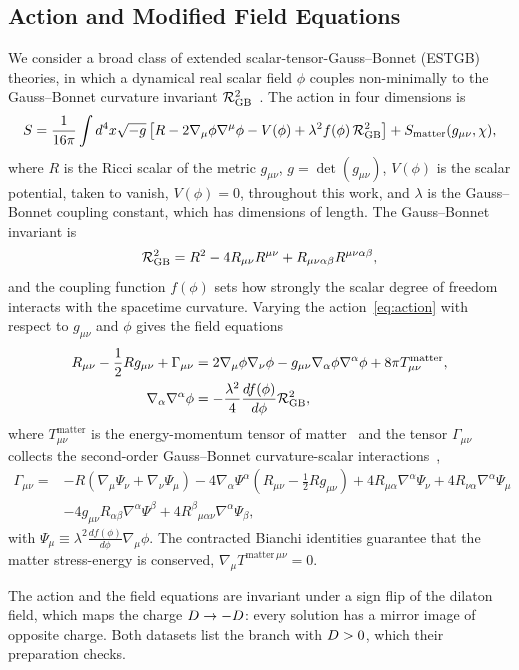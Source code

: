 \subsection{Action and Modified Field Equations}
\label{sec:action}

We consider a broad class of extended scalar-tensor-Gauss--Bonnet (ESTGB) theories, in which a dynamical real scalar field $\phi$ couples non-minimally to the Gauss--Bonnet curvature invariant $\mathcal{R}^2_{\mathrm{GB}}$~\citep{Doneva2017_BH,Doneva2017_NS}. The action in four dimensions is~\citep{Doneva2017_BH}
\begin{equation}
  S = \frac{1}{16\pi} \int d^4x \sqrt{-g} \left[ R - 2\nabla_\mu \phi \nabla^\mu \phi - V(\phi) + \lambda^2 f(\phi)\, \mathcal{R}^2_{\mathrm{GB}} \right] + S_{\mathrm{matter}}(g_{\mu\nu}, \chi),
  \label{eq:action}
\end{equation}
where $R$ is the Ricci scalar of the metric $g_{\mu\nu}$, $g = \det(g_{\mu\nu})$, $V(\phi)$ is the scalar potential, taken to vanish, $V(\phi) = 0$, throughout this work, and $\lambda$ is the Gauss--Bonnet coupling constant, which has dimensions of length. The Gauss--Bonnet invariant is~\citep{TODO_GaussBonnetInvariant}
\begin{equation}
  \mathcal{R}^2_{\mathrm{GB}} = R^2 - 4 R_{\mu\nu} R^{\mu\nu} + R_{\mu\nu\alpha\beta} R^{\mu\nu\alpha\beta},
  \label{eq:gauss-bonnet}
\end{equation}
and the coupling function $f(\phi)$ sets how strongly the scalar degree of freedom interacts with the spacetime curvature. Varying the action~\eqref{eq:action} with respect to $g_{\mu\nu}$ and $\phi$ gives the field equations~\citep{Doneva2017_BH}
\begin{align}
  R_{\mu\nu} - \frac{1}{2} R g_{\mu\nu} + \Gamma_{\mu\nu} &= 2 \nabla_\mu \phi \nabla_\nu \phi - g_{\mu\nu} \nabla_\alpha \phi \nabla^\alpha \phi + 8\pi T^{\mathrm{matter}}_{\mu\nu}, \label{eq:field-metric} \\
  \nabla_\alpha \nabla^\alpha \phi &= -\frac{\lambda^2}{4} \frac{df(\phi)}{d\phi} \mathcal{R}^2_{\mathrm{GB}}, \label{eq:field-scalar}
\end{align}
where $T^{\mathrm{matter}}_{\mu\nu}$ is the energy-momentum tensor of matter~\citep{TODO_StressEnergy} and the tensor $\Gamma_{\mu\nu}$ collects the second-order Gauss--Bonnet curvature-scalar interactions~\citep{Doneva2017_BH},
\begin{equation}
  \begin{split}
    \Gamma_{\mu\nu} = {}& -R \left( \nabla_\mu \Psi_\nu + \nabla_\nu \Psi_\mu \right) - 4 \nabla_\alpha \Psi^\alpha \left( R_{\mu\nu} - \frac{1}{2} R g_{\mu\nu} \right) + 4 R_{\mu\alpha} \nabla^\alpha \Psi_\nu + 4 R_{\nu\alpha} \nabla^\alpha \Psi_\mu \\
    & - 4 g_{\mu\nu} R_{\alpha\beta} \nabla^\alpha \Psi^\beta + 4 R^{\beta}{}_{\mu\alpha\nu} \nabla^\alpha \Psi_\beta,
  \end{split}
  \label{eq:gamma}
\end{equation}
with $\Psi_\mu \equiv \lambda^2 \frac{df(\phi)}{d\phi} \nabla_\mu \phi$. The contracted Bianchi identities guarantee that the matter stress-energy is conserved, $\nabla_\mu T^{\mathrm{matter}\,\mu\nu} = 0$.

The action and the field equations are invariant under a sign flip of the dilaton field, which maps the charge $D \to -D$: every solution has a mirror image of opposite charge. Both datasets list the branch with $D > 0$, which their preparation checks.
